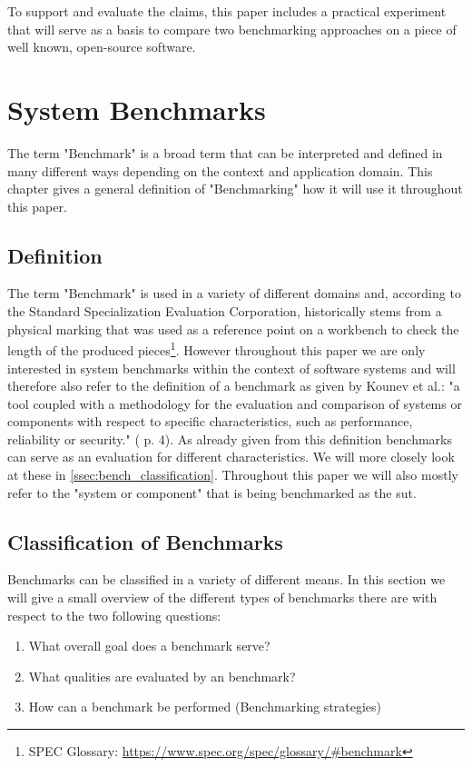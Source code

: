 \documentclass[	runningheads,
				a4paper]{llncs}
\begin{document}
To support and evaluate the claims, this paper includes a practical experiment that will serve as a basis to compare two benchmarking approaches on a piece of well known, open-source software.

\section{System Benchmarks}
\label{sec:benchmarking}
The term "Benchmark" is a broad term that can be interpreted and defined in many different ways depending on the context and application domain. This chapter gives a general definition of "Benchmarking" how it will use it throughout this paper.

\subsection{Definition}
\label{ssec:bench_definition}
The term "Benchmark" is used in a variety of different domains and, according to the Standard Specialization Evaluation Corporation, historically stems from a physical marking that was used as a reference point on a workbench to check the length of the produced pieces\footnote{SPEC Glossary: \url{https://www.spec.org/spec/glossary/\#benchmark}}. However throughout this paper we are only interested in system benchmarks within the context of software systems and will therefore also refer to the definition of a benchmark as given by Kounev et al.: "a tool coupled with a methodology for the evaluation and comparison of systems or components with respect to specific characteristics, such as performance, reliability or security." (\cite{Kounev} p. 4). As already given from this definition benchmarks can serve as an evaluation for different characteristics. We will more closely look at these in \autoref{ssec:bench_classification}. Throughout this paper we will also mostly refer to the "system or component" that is being benchmarked as the \gls{sut}.

\subsection{Classification of Benchmarks}
\label{ssec:bench_classification}
Benchmarks can be classified in a variety of different means. In this section we will give a small overview of the different types of benchmarks there are with respect to the two following questions:
\begin{enumerate}
	\item What overall goal does a benchmark serve?
	\item What qualities are evaluated by an benchmark?
	\item How can a benchmark be performed (Benchmarking strategies)
\end{enumerate}
\end{document}
